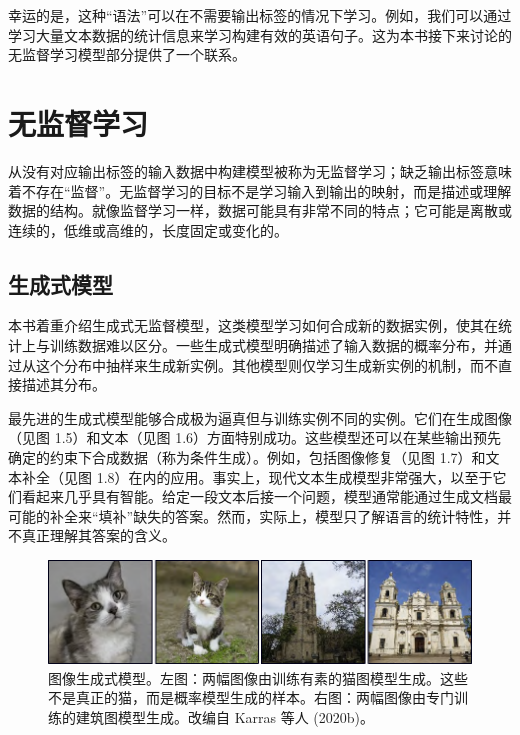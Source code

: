 \documentclass[lang=cn,newtx,10pt,scheme=chinese]{elegantbook}
\begin{document}
幸运的是，这种“语法”可以在不需要输出标签的情况下学习。例如，我们可以通过学习大量文本数据的统计信息来学习构建有效的英语句子。这为本书接下来讨论的无监督学习模型部分提供了一个联系。

\section{无监督学习}
从没有对应输出标签的输入数据中构建模型被称为无监督学习；缺乏输出标签意味着不存在“监督”。无监督学习的目标不是学习输入到输出的映射，而是描述或理解数据的结构。就像监督学习一样，数据可能具有非常不同的特点；它可能是离散或连续的，低维或高维的，长度固定或变化的。

\subsection{生成式模型}
本书着重介绍生成式无监督模型，这类模型学习如何合成新的数据实例，使其在统计上与训练数据难以区分。一些生成式模型明确描述了输入数据的概率分布，并通过从这个分布中抽样来生成新实例。其他模型则仅学习生成新实例的机制，而不直接描述其分布。

最先进的生成式模型能够合成极为逼真但与训练实例不同的实例。它们在生成图像（见图 1.5）和文本（见图 1.6）方面特别成功。这些模型还可以在某些输出预先确定的约束下合成数据（称为条件生成）。例如，包括图像修复（见图 1.7）和文本补全（见图 1.8）在内的应用。事实上，现代文本生成模型非常强大，以至于它们看起来几乎具有智能。给定一段文本后接一个问题，模型通常能通过生成文档最可能的补全来“填补”缺失的答案。然而，实际上，模型只了解语言的统计特性，并不真正理解其答案的含义。

\begin{figure}
	\centering
	\includegraphics[width=0.7\linewidth]{PDFFigures/UDLChap1PDF/IntroSynthesis_C.pdf}
	\caption{图像生成式模型。左图：两幅图像由训练有素的猫图模型生成。这些不是真正的猫，而是概率模型生成的样本。右图：两幅图像由专门训练的建筑图模型生成。改编自 Karras 等人 (2020b)。}

\end{figure}

\end{document}
